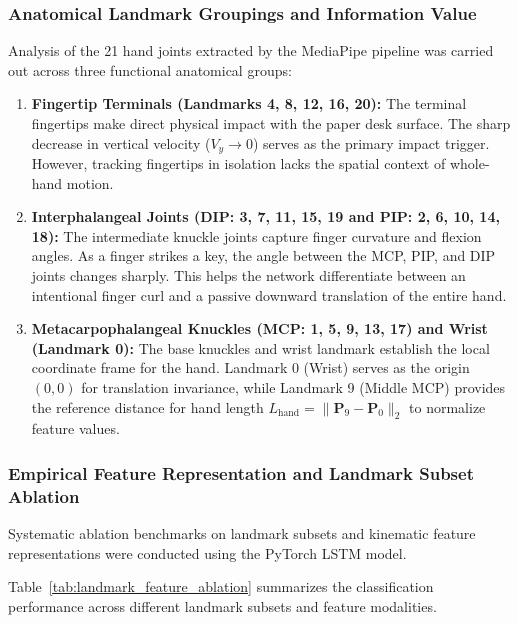 \subsubsection{Anatomical Landmark Groupings and Information Value}
Analysis of the 21 hand joints extracted by the MediaPipe pipeline was carried out across three functional anatomical groups:
\begin{enumerate}
    \item \textbf{Fingertip Terminals (Landmarks 4, 8, 12, 16, 20):} The terminal fingertips make direct physical impact with the paper desk surface. The sharp decrease in vertical velocity ($V_y \to 0$) serves as the primary impact trigger. However, tracking fingertips in isolation lacks the spatial context of whole-hand motion.
    \item \textbf{Interphalangeal Joints (DIP: 3, 7, 11, 15, 19 and PIP: 2, 6, 10, 14, 18):} The intermediate knuckle joints capture finger curvature and flexion angles. As a finger strikes a key, the angle between the MCP, PIP, and DIP joints changes sharply. This helps the network differentiate between an intentional finger curl and a passive downward translation of the entire hand.
    \item \textbf{Metacarpophalangeal Knuckles (MCP: 1, 5, 9, 13, 17) and Wrist (Landmark 0):} The base knuckles and wrist landmark establish the local coordinate frame for the hand. Landmark 0 (Wrist) serves as the origin $(0, 0)$ for translation invariance, while Landmark 9 (Middle MCP) provides the reference distance for hand length $L_{\text{hand}} = \|\mathbf{P}_9 - \mathbf{P}_0\|_2$ to normalize feature values.
\end{enumerate}

\subsubsection{Empirical Feature Representation and Landmark Subset Ablation}
Systematic ablation benchmarks on landmark subsets and kinematic feature representations were conducted using the PyTorch LSTM model.

Table~\ref{tab:landmark_feature_ablation} summarizes the classification performance across different landmark subsets and feature modalities.

